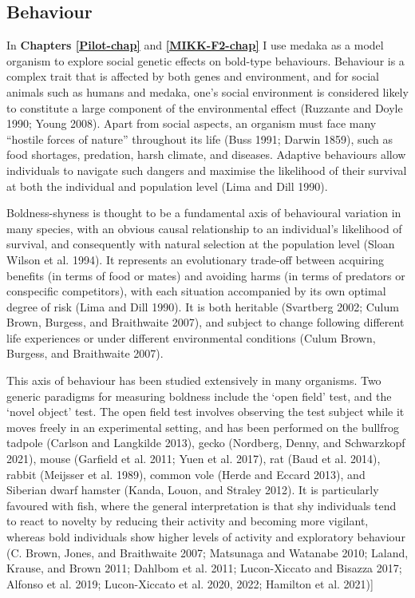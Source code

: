 \documentclass[
]{book}
\begin{document}
\hypertarget{behaviour}{%
\subsection{Behaviour}\label{behaviour}}

In \textbf{Chapters \ref{Pilot-chap}} and \textbf{\ref{MIKK-F2-chap}} I use medaka as a model organism to explore social genetic effects on bold-type behaviours. Behaviour is a complex trait that is affected by both genes and environment, and for social animals such as humans and medaka, one's social environment is considered likely to constitute a large component of the environmental effect (Ruzzante and Doyle 1990; Young 2008). Apart from social aspects, an organism must face many ``hostile forces of nature'' throughout its life (Buss 1991; Darwin 1859), such as food shortages, predation, harsh climate, and diseases. Adaptive behaviours allow individuals to navigate such dangers and maximise the likelihood of their survival at both the individual and population level (Lima and Dill 1990).

Boldness-shyness is thought to be a fundamental axis of behavioural variation in many species, with an obvious causal relationship to an individual's likelihood of survival, and consequently with natural selection at the population level (Sloan Wilson et al. 1994). It represents an evolutionary trade-off between acquiring benefits (in terms of food or mates) and avoiding harms (in terms of predators or conspecific competitors), with each situation accompanied by its own optimal degree of risk (Lima and Dill 1990). It is both heritable (Svartberg 2002; Culum Brown, Burgess, and Braithwaite 2007), and subject to change following different life experiences or under different environmental conditions (Culum Brown, Burgess, and Braithwaite 2007).

This axis of behaviour has been studied extensively in many organisms. Two generic paradigms for measuring boldness include the `open field' test, and the `novel object' test. The open field test involves observing the test subject while it moves freely in an experimental setting, and has been performed on the bullfrog tadpole (Carlson and Langkilde 2013), gecko (Nordberg, Denny, and Schwarzkopf 2021), mouse (Garfield et al. 2011; Yuen et al. 2017), rat (Baud et al. 2014), rabbit (Meijsser et al. 1989), common vole (Herde and Eccard 2013), and Siberian dwarf hamster (Kanda, Louon, and Straley 2012). It is particularly favoured with fish, where the general interpretation is that shy individuals tend to react to novelty by reducing their activity and becoming more vigilant, whereas bold individuals show higher levels of activity and exploratory behaviour (C. Brown, Jones, and Braithwaite 2007; Matsunaga and Watanabe 2010; Laland, Krause, and Brown 2011; Dahlbom et al. 2011; Lucon-Xiccato and Bisazza 2017; Alfonso et al. 2019; Lucon-Xiccato et al. 2020, 2022; Hamilton et al. 2021){]}
\end{document}
